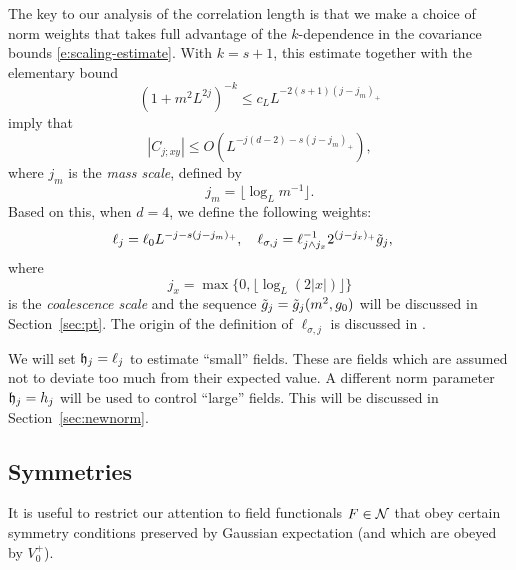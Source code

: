 The key to our analysis of the correlation length is that we make a choice of norm
weights that takes full advantage of the
$k$-dependence in the covariance bounds \eqref{e:scaling-estimate}.
With $k = s + 1$, this estimate together with the elementary bound
\begin{equation}
\label{e:mass-decay}
(1 + m^2 L^{2j})^{-k} \le c_L L^{-2(s+1)(j - j_m)_+}
\end{equation}
imply that
\begin{equation}
|C_{j;xy}| \le O(L^{-j (d - 2) - s (j - j_m)_+}),
\end{equation}
where $j_m$ is the \emph{mass scale}, defined by
\begin{equation}
\label{e:jmdef}
j_m	= \lfloor\log_{L} m^{-1}\rfloor.
\end{equation}
Based on this, when $d = 4$, we define the following weights:
\begin{align}
\label{e:elldef-zz}
\ell_j &= \ell_0 L^{-j - s (j - j_m)_+}, \quad
\ell_{\sigma,j}
=
\ell_{j \wedge j_{x}}^{-1} 2^{(j - j_{x})_+} \tilde{g}_j,
\end{align}
where
\begin{equation}
\label{e:jxdef}
j_x = \max\{0,\lfloor \log_{L} (2 |x|)\rfloor\}
\end{equation}
is the \emph{coalescence scale}
and the sequence $\tilde{g}_j = \tilde{g}_j(m^2,g_0)$ will be discussed
in Section~\ref{sec:pt}.
The origin of the definition of $\ell_{\sigma,j}$ is discussed in
\cite[Remark~\ref{IE-rk:hsigmot}]{BS-rg-IE}.

We will set $\mathfrak{h}_j = \ell_j$ to estimate ``small'' fields. These are fields which
are assumed not to deviate too much from their expected value. A different norm
parameter $\mathfrak{h}_j = h_j$ will be used to control ``large'' fields.
This will be discussed in Section~\ref{sec:newnorm}.


\subsection{Symmetries}

It is useful to restrict our attention to field functionals $F \in \mathcal{N}$ that
obey certain symmetry conditions preserved by Gaussian expectation (and which
are obeyed by $V^+_0$).

